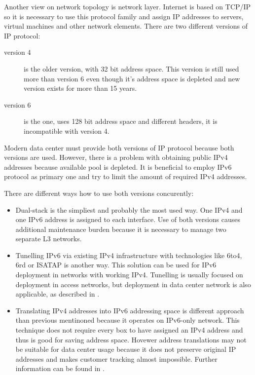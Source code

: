 Another view on network topology is network layer. Internet is based on \Ac{TCP}/\Ac{IP} so it is necessary to use this protocol family and assign \Ac{IP} addresses to servers, virtual machines and other network elements. There are two different versions of \Ac{IP} protocol:
\begin{description}
	\item[version 4] is the older version, with 32 bit address space. This version is still used more than version 6 even though it's address space is depleted and new version exists for more than 15 years.
	\item[version 6] is the  one, uses 128 bit address space and different headers, it is incompatible with version 4.
\end{description}

Modern data center must provide both versions of \Ac{IP} protocol because both versions are used.
However, there is a problem with obtaining public \Ac{IPv4} addresses because available pool is depleted. It is beneficial to employ \Ac{IPv6} protocol as primary one and try to limit the amount of required \Ac{IPv4} addresses.


There are different ways how to use both versions concurently:
\begin{itemize}
	\item Dual-stack is the simpliest and probably the most used way. One \Ac{IPv4} and one \Ac{IPv6} address is assigned to each interface. Use of both versions causes additional maintenance burden because it is necessary to manage two separate L3 networks.
	\item Tunelling \Ac{IPv6} via existing \Ac{IPv4} infrastructure with technologies like 6to4, 6rd or \Ac{ISATAP} is another way. This solution can be used for \Ac{IPv6} deployment in networks with working \Ac{IPv4}. 
	Tunelling is usually focused on deployment in access networks, but deployment in data center network is also applicable, as described in \cite{draft-sakura-6rd}.
	\item Translating \Ac{IPv4} addresses into \Ac{IPv6} addressing space is different approach than previous mentinoned because it operates on \Ac{IPv6}-only network. This technique does not require every box to have assigned an \Ac{IPv4} address and thus is good for saving address space. Hovewer address translations may not be suitable for data center usage because it does not preserve original \Ac{IP} addresses and makes customer tracking almost impossible. Further information can be found in \cite{ipv4-jako-sluzba}.
\end{itemize}


